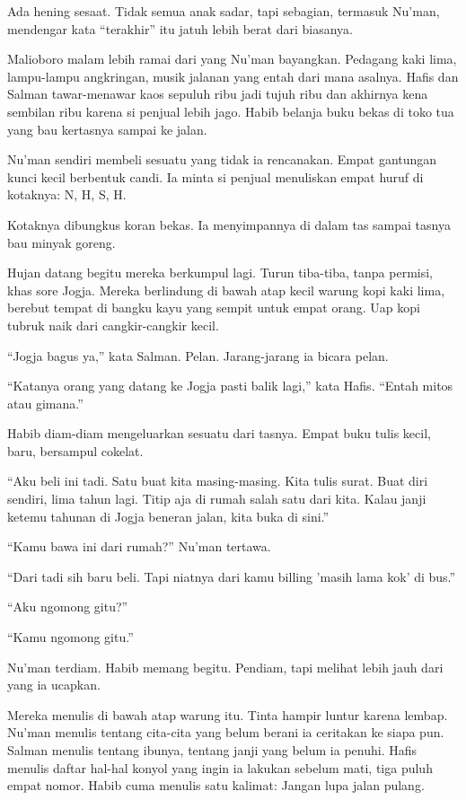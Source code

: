 Ada hening sesaat. Tidak semua anak sadar, tapi sebagian, termasuk Nu'man, mendengar kata ``terakhir'' itu jatuh lebih berat dari biasanya.

Malioboro malam lebih ramai dari yang Nu'man bayangkan. Pedagang kaki lima, lampu-lampu angkringan, musik jalanan yang entah dari mana asalnya. Hafis dan Salman tawar-menawar kaos sepuluh ribu jadi tujuh ribu dan akhirnya kena sembilan ribu karena si penjual lebih jago. Habib belanja buku bekas di toko tua yang bau kertasnya sampai ke jalan.

Nu'man sendiri membeli sesuatu yang tidak ia rencanakan. Empat gantungan kunci kecil berbentuk candi. Ia minta si penjual menuliskan empat huruf di kotaknya: N, H, S, H.

Kotaknya dibungkus koran bekas. Ia menyimpannya di dalam tas sampai tasnya bau minyak goreng.

Hujan datang begitu mereka berkumpul lagi. Turun tiba-tiba, tanpa permisi, khas sore Jogja. Mereka berlindung di bawah atap kecil warung kopi kaki lima, berebut tempat di bangku kayu yang sempit untuk empat orang. Uap kopi tubruk naik dari cangkir-cangkir kecil.

``Jogja bagus ya,'' kata Salman. Pelan. Jarang-jarang ia bicara pelan.

``Katanya orang yang datang ke Jogja pasti balik lagi,'' kata Hafis. ``Entah mitos atau gimana.''

Habib diam-diam mengeluarkan sesuatu dari tasnya. Empat buku tulis kecil, baru, bersampul cokelat.

``Aku beli ini tadi. Satu buat kita masing-masing. Kita tulis surat. Buat diri sendiri, lima tahun lagi. Titip aja di rumah salah satu dari kita. Kalau janji ketemu tahunan di Jogja beneran jalan, kita buka di sini.''

``Kamu bawa ini dari rumah?'' Nu'man tertawa.

``Dari tadi sih baru beli. Tapi niatnya dari kamu billing 'masih lama kok' di bus.''

``Aku ngomong gitu?''

``Kamu ngomong gitu.''

Nu'man terdiam. Habib memang begitu. Pendiam, tapi melihat lebih jauh dari yang ia ucapkan.

Mereka menulis di bawah atap warung itu. Tinta hampir luntur karena lembap. Nu'man menulis tentang cita-cita yang belum berani ia ceritakan ke siapa pun. Salman menulis tentang ibunya, tentang janji yang belum ia penuhi. Hafis menulis daftar hal-hal konyol yang ingin ia lakukan sebelum mati, tiga puluh empat nomor. Habib cuma menulis satu kalimat: Jangan lupa jalan pulang.

